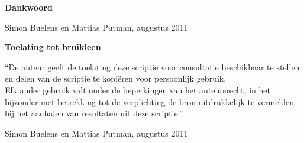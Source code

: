 
\newpage

\noindent \textbf{\huge Dankwoord}

\vspace{1.5cm}

\noindent

%
%
%

\addvspace{4cm}

\noindent Simon Buelens en Mattias Putman, augustus 2011\newpage

\noindent \textbf{\huge Toelating tot bruikleen}

\vspace{1.5cm}

\noindent
``De auteur geeft de toelating deze scriptie voor consultatie beschikbaar
te stellen en delen van de scriptie te kopi\"eren voor persoonlijk
gebruik.\\
Elk ander gebruik valt onder de beperkingen van het auteursrecht,
in het bijzonder met betrekking tot de verplichting de bron uitdrukkelijk
te vermelden bij het aanhalen van resultaten uit deze scriptie.''

\addvspace{4cm}

\noindent Simon Buelens en Mattias Putman, augustus 2011\newpage
